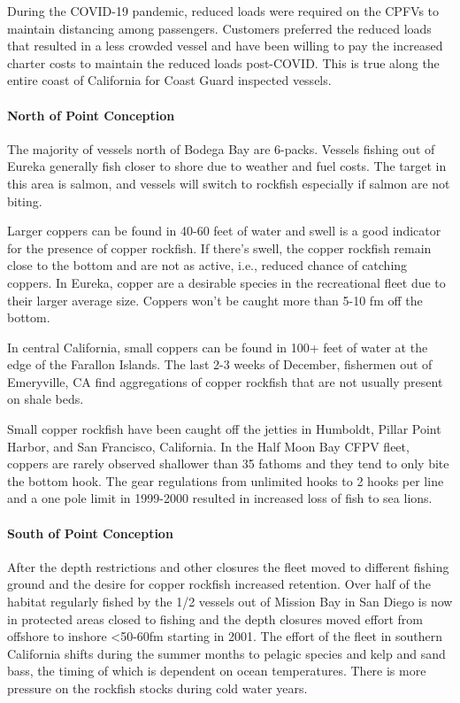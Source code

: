 \documentclass[11pt,
  english,
  letterpaper,
]{article}
\begin{document}
During the COVID-19 pandemic, reduced loads were required on the CPFVs to maintain distancing among passengers. Customers preferred the reduced loads that resulted in a less crowded vessel and have been willing to pay the increased charter costs to maintain the reduced loads post-COVID. This is true along the entire coast of California for Coast Guard inspected vessels.

\hypertarget{north-of-point-conception}{%
\paragraph{North of Point Conception}\label{north-of-point-conception}}

The majority of vessels north of Bodega Bay are 6-packs. Vessels fishing out of Eureka generally fish closer to shore due to weather and fuel costs. The target in this area is salmon, and vessels will switch to rockfish especially if salmon are not biting.

Larger coppers can be found in 40-60 feet of water and swell is a good indicator for the presence of copper rockfish. If there's swell, the copper rockfish remain close to the bottom and are not as active, i.e., reduced chance of catching coppers. In Eureka, copper are a desirable species in the recreational fleet due to their larger average size. Coppers won't be caught more than 5-10 fm off the bottom.

In central California, small coppers can be found in 100+ feet of water at the edge of the Farallon Islands. The last 2-3 weeks of December, fishermen out of Emeryville, CA find aggregations of copper rockfish that are not usually present on shale beds.

Small copper rockfish have been caught off the jetties in Humboldt, Pillar Point Harbor, and San Francisco, California. In the Half Moon Bay CFPV fleet, coppers are rarely observed shallower than 35 fathoms and they tend to only bite the bottom hook. The gear regulations from unlimited hooks to 2 hooks per line and a one pole limit in 1999-2000 resulted in increased loss of fish to sea lions.

\hypertarget{south-of-point-conception}{%
\paragraph{South of Point Conception}\label{south-of-point-conception}}

After the depth restrictions and other closures the fleet moved to different fishing ground and the desire for copper rockfish increased retention. Over half of the habitat regularly fished by the 1/2 vessels out of Mission Bay in San Diego is now in protected areas closed to fishing and the depth closures moved effort from offshore to inshore \textless50-60fm starting in 2001. The effort of the fleet in southern California shifts during the summer months to pelagic species and kelp and sand bass, the timing of which is dependent on ocean temperatures. There is more pressure on the rockfish stocks during cold water years.
\end{document}
